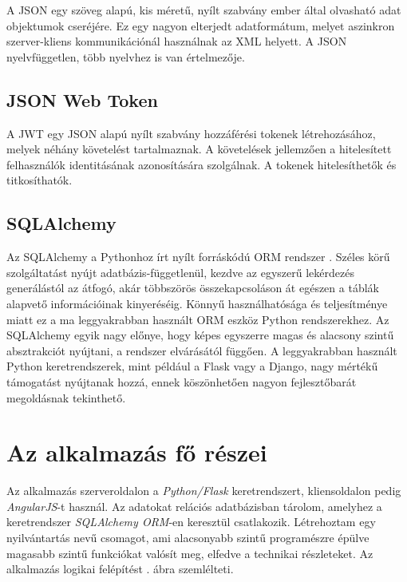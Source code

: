A JSON egy szöveg alapú, kis méretű, nyílt szabvány ember által olvasható adat objektumok cseréjére. Ez egy nagyon elterjedt adatformátum, melyet aszinkron szerver-kliens kommunikációnál használnak az XML helyett. A JSON nyelvfüggetlen, több nyelvhez is van értelmezője.

\subsection{JSON Web Token}
A JWT egy JSON alapú nyílt szabvány hozzáférési tokenek létrehozásához, melyek néhány követelést tartalmaznak. A követelések jellemzően a hitelesített felhasználók identitásának azonosítására szolgálnak. A tokenek hitelesíthetők és titkosíthatók.

\subsection{SQLAlchemy}

Az SQLAlchemy a Pythonhoz írt nyílt forráskódú ORM rendszer \cite{sqlalchemy}. Széles körű szolgáltatást nyújt adatbázis-függetlenül, kezdve az egyszerű lekérdezés generálástól az átfogó, akár többszörös összekapcsoláson át egészen a táblák alapvető információinak kinyeréséig. Könnyű használhatósága és teljesítménye miatt ez a ma leggyakrabban használt ORM eszköz Python rendszerekhez. 
Az SQLAlchemy egyik nagy előnye, hogy képes egyszerre magas és alacsony szintű absztrakciót nyújtani, a rendszer elvárásától függően. A leggyakrabban használt Python keretrendszerek, mint például a Flask vagy a Django, nagy mértékű támogatást nyújtanak hozzá, ennek köszönhetően nagyon fejlesztőbarát megoldásnak tekinthető.

\section{Az alkalmazás fő részei}

Az alkalmazás szerveroldalon a \textit{Python/Flask} keretrendszert, kliensoldalon pedig \textit{AngularJS}-t használ. Az adatokat relációs adatbázisban tárolom, amelyhez a keretrendszer \textit{SQLAlchemy ORM}-en keresztül csatlakozik. Létrehoztam egy nyilvántartás nevű csomagot, ami alacsonyabb szintű programészre épülve magasabb szintű funkciókat valósít meg, elfedve a technikai részleteket. Az alkalmazás logikai felépítést . ábra szemlélteti.

